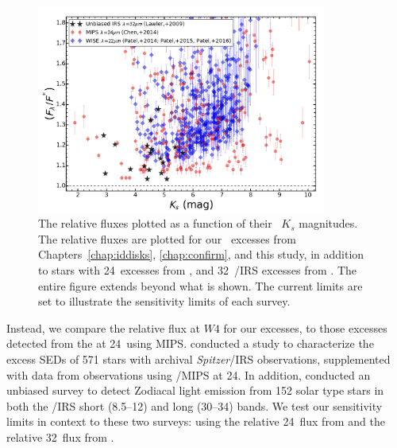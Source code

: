     \begin{figure}
    \centering
    \includegraphics[width=0.85\textwidth]{Ch5/relflux_wise_mips_irs_120pc}
    \caption[Our Survey Flux Sensitivity]{The relative fluxes plotted as a function of their \mass\ $K_s$ magnitudes. The relative fluxes are plotted for our \WS\ excesses from Chapters~\ref{chap:iddisks}, \ref{chap:confirm}, and this study, in addition to stars with 24\micron\ excesses from \citet{Chen2014}, and 32\micron\ \spitzer/IRS excesses from \citet{Lawler2009}. The entire figure extends beyond what is shown. The current limits are set to illustrate the sensitivity limits of each survey.}
    \label{fig:wise_relflux}
    \end{figure}
    
    
    Instead, we compare the relative flux at $W4$ for our excesses, to those excesses detected from the \spitzer at 24\micron\ using MIPS. \citet{Chen2014} conducted a study to characterize the excess SEDs of 571 stars with archival \textit{Spitzer}/IRS observations, supplemented with data from observations using \spitzer/MIPS at 24\micron. In addition, \citet{Lawler2009} conducted an unbiased survey to detect Zodiacal light emission from 152 solar type stars in both the \spitzer/IRS short (8.5--12\micron) and long (30--34\micron) bands. We test our sensitivity limits in context to these two surveys: using the relative 24\micron\ flux from \citet{Chen2014} and the relative 32\micron\ flux from \citet{Lawler2009}.
    
    
    
